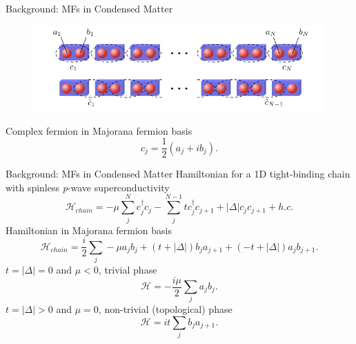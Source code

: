 \documentclass[xcolor=dvipsnames,10pt,aspectratio=169]{beamer}
\newcommand{\ham}{\mathcal{H}}
\newcommand{\cc}{c^{\dagger}}
\newcommand{\de}{\Delta}
\newcommand{\BD}{Background}
\begin{document}
  \begin{frame}{\BD: MFs in Condensed Matter}
    \begin{figure}
      \includegraphics[width=\textwidth]{./figures/kitaev-chain.pdf}
    \end{figure}

    \vspace{20pt}
    Complex fermion in Majorana fermion basis
    \begin{equation}
      c_j = \dfrac{1}{2}(a_j + i b_j).
    \end{equation}

  \end{frame}

  \begin{frame}{\BD: MFs in Condensed Matter}
    Hamiltonian for a 1D tight-binding chain with spinless \textit{p}-wave superconductivity
    \begin{equation}
      \ham_{chain} = -\mu\sum_j^N \cc_j c_j -\sum_j^{N-1} t \cc_j c_{j+1} + |\de| c_j c_{j+1} + h.c.
    \end{equation}
    Hamiltonian in Majorana fermion basis
    \begin{equation}
      \ham_{chain} = \dfrac{i}{2} \sum_j -\mu a_j b_j + (t+|\de|) b_j a_{j+1} + (-t+|\de|) a_j b_{j+1}.
    \end{equation}
    $t=|\de|=0$ and $\mu<0$, trivial phase
    \begin{equation}
      \ham = -\dfrac{i\mu}{2} \sum_j a_j b_j.
    \end{equation}
    $t=|\de|>0$ and $\mu=0$, non-trivial (topological) phase
    \begin{equation}
      \ham = it \sum_j b_j a_{j+1}.
    \end{equation}

  \end{frame}
\end{document}
